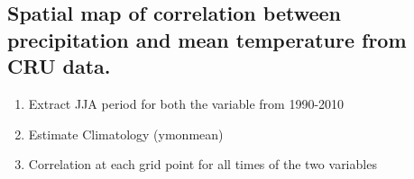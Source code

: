 \documentclass[10pt, a4paper]{article}
\begin{document}
\subsection*{Spatial map of correlation between precipitation and mean temperature from CRU data.}

\begin{Problem}
    \begin{enumerate}
        \item Extract JJA period for both the variable from 1990-2010
        \item Estimate Climatology (ymonmean)
        \item Correlation at each grid point for all times of the two variables
    \end{enumerate}
\end{Problem}
\end{document}
